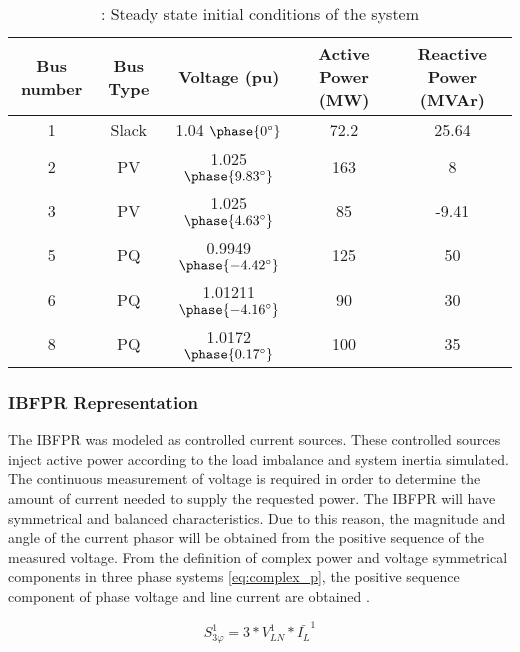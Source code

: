 \begin{table}[h]
	\caption{\label{tb:initial}: Steady state initial conditions of the system}
	\centering
	\begin{tabular}{ccccc}
		\toprule
		\textbf{Bus number}	& \textbf{Bus Type}	& \textbf{Voltage (pu)}& \textbf{Active Power (MW)}& \textbf{Reactive Power (MVAr)}\\
		\midrule
		1		& Slack			& 1.04 $\phase{0^{\circ}} $     &    72.2    & 25.64    \\
		2		& PV			& 1.025 $\phase{9.83^{\circ}} $      & 163      & 8     \\
		3		& PV			& 1.025 $\phase{4.63^{\circ}} $     & 85       &    -9.41 \\
		5		& PQ			& 0.9949 $\phase{-4.42^{\circ}} $       &125       &  50    \\
		6		& PQ			& 1.01211 $\phase{-4.16^{\circ}} $      &   90     &  30   \\
		8		& PQ			& 1.0172 $ \phase{0.17^{\circ}} $       &  100     &   35   \\

		\bottomrule
	\end{tabular}
\end{table}


\subsubsection{IBFPR Representation}


The IBFPR was modeled as controlled current sources. These controlled sources inject active power according to the load imbalance and system inertia simulated. The continuous measurement of voltage is required in order to determine the amount of current needed to supply the requested power. The IBFPR will have symmetrical and balanced characteristics. Due to this reason, the magnitude and angle of the current phasor will be obtained from the positive sequence of the measured voltage. From the definition of complex power and voltage symmetrical components in three phase systems \eqref{eq:complex_p}, the positive sequence component of phase voltage and line current are obtained \cite{john1994power}.

\begin{equation}
\label{eq:complex_p}
S_{3\varphi}^1=3*V_{LN}^1*\bar{I_{L}}^1
\end{equation}


